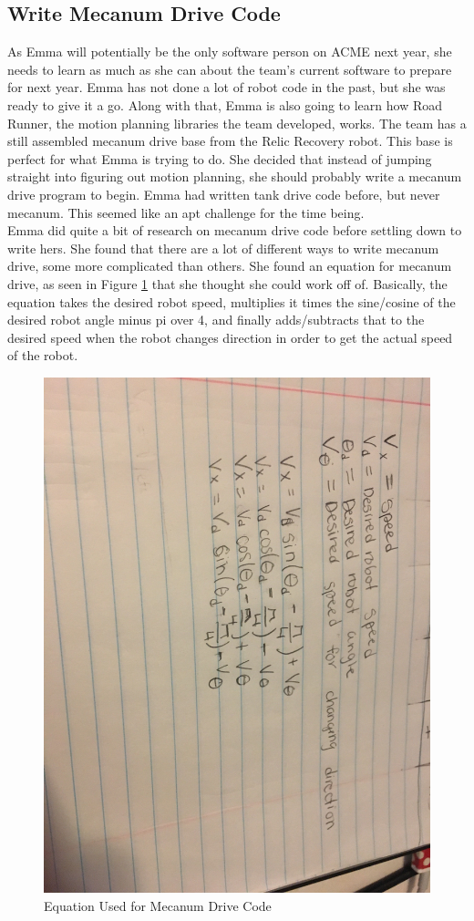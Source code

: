 \documentclass{article}
\begin{document}
\subsection{Write Mecanum Drive Code}
As Emma will potentially be the only software person on ACME next year, she needs to learn as much as she can about the team's current software to prepare for next year. Emma has not done a lot of robot code in the past, but she was ready to give it a go. Along with that, Emma is also going to learn how Road Runner, the motion planning libraries the team developed, works. The team has a still assembled mecanum drive base from the Relic Recovery robot. This base is perfect for what Emma is trying to do. She decided that instead of jumping straight into figuring out motion planning, she should probably write a mecanum drive program to begin. Emma had written tank drive code before, but never mecanum. This seemed like an apt challenge for the time being. \\

Emma did quite a bit of research on mecanum drive code before settling down to write hers. She found that there are a lot of different ways to write mecanum drive, some more complicated than others. She found an equation for mecanum drive, as seen in Figure \ref{fig:equation} that she thought she could work off of. Basically, the equation takes the desired robot speed, multiplies it times the sine/cosine of the desired robot angle minus pi over 4, and finally adds/subtracts that to the desired speed when the robot changes direction in order to get the actual speed of the robot. \\

\begin{figure}
    \centering
    \includegraphics[width= 0.5 \textwidth, angle=90 ] {29_03-18/images/equation.JPG}
    \caption{Equation Used for Mecanum Drive Code}
    \label{fig:equation}
\end{figure}
\end{document}
